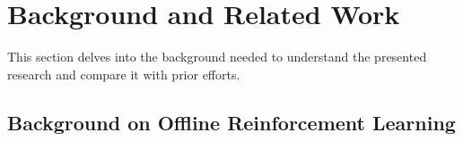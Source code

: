 \section{Background and Related Work}\label{ch4:sec:Related}

This section delves into the background needed to understand the presented research and compare it with prior efforts.

\subsection{Background on Offline Reinforcement Learning}


